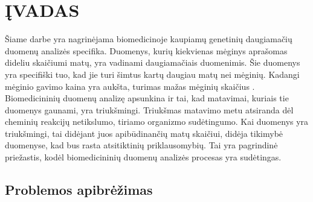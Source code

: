 
\newpage
\section*{ĮVADAS}



Šiame darbe yra nagrinėjama biomedicinoje kaupiamų genetinių daugiamačių duomenų analizės specifika. Duomenys, kurių kiekvienas mėginys aprašomas dideliu skaičiumi matų, yra vadinami daugiamačiais duomenimis. Šie duomenys yra specifiški tuo, kad jie turi šimtus kartų daugiau matų nei mėginių. Kadangi mėginio gavimo kaina yra aukšta, turimas mažas mėginių skaičius \cite{pettersson2009generations}. Biomedicininių duomenų analizę apsunkina ir tai, kad matavimai, kuriais tie duomenys gaunami, yra triukšmingi. Triukšmas matavimo metu atsiranda dėl cheminių reakcijų netikslumo, tiriamo organizmo sudėtingumo. Kai duomenys yra triukšmingi, tai didėjant juos apibūdinančių matų skaičiui, didėja tikimybė duomenyse, kad bus rasta atsitiktinių priklausomybių. Tai yra pagrindinė priežastis, kodėl biomedicininių duomenų analizės procesas yra sudėtingas.



\subsection*{Problemos apibrėžimas}

